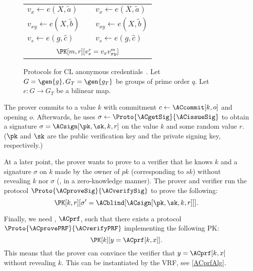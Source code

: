 \begin{figure}
\begin{tabular}{lcl}
    \(v_x\gets e(X, \tilde a)\)
    &
    & \(v_x\gets e(X, \tilde a)\)

    \\

    \(v_{xy}\gets e(X, \tilde b)\)
    &
    & \(v_{xy}\gets e(X, \tilde b)\)

    \\

    \(v_s\gets e(g, \hat c)\)
    &
    & \(v_s\gets e(g, \hat c)\)

    \\\\

    \multicolumn{3}{c}{\(\PK[m,r][v_s^r = v_x v_{xy}^m]\)}

    \\%
  \end{tabular}
  \caption{\label{ACacAlg}%
    Protocols for CL anonymous credentials~\cite{CLsignatures}.
    Let \(G = \gen{g}, G_T = \gen{g_T}\) be groups of prime order \(q\).
    Let \(e\colon G\to G_T\) be a bilinear map.
  }
\end{figure}

The prover commits to a value \(k\) with commitment \(c\gets \ACcommit[k, o]\) 
and opening \(o\).
Afterwards, he uses \(\sigma\gets \Proto{\ACgetSig}{\ACissueSig}\) to obtain a 
signature \(\sigma = \ACsign[\pk, \sk, k, r]\) on the value \(k\) and some 
random value \(r\).
(\(\pk\) and \(\sk\) are the public verification key and the private signing 
key, respectively.)

At a later point, the prover wants to prove to a verifier that he knows \(k\) and a signature \(\sigma\) on \(k\) made by the owner of \(pk\) (corresponding to \(sk\)) without revealing \(k\) nor \(\sigma\) (\ie, in a zero-knowledge manner).
The prover and verifier run the protocol \(\Proto{\ACproveSig}{\ACverifySig}\) 
to prove the following:
\begin{equation*}
  \PK[k, r][\sigma' = \ACblind[\ACsign[\pk, \sk, k, r]]].
\end{equation*}

Finally, we need , \(\ACprf\), such that there exists a protocol 
\(\Proto{\ACprovePRF}{\ACverifyPRF}\) implementing the following \ac{PK}:
\begin{equation*}
  \PK[k][y = \ACprf[k, x]].
\end{equation*}
This means that the prover can convince the verifier that \(y = \ACprf[k, x]\) 
without revealing \(k\).
This can be instantiated by the \textcite{DY-VRF} \ac{VRF}, see 
\cref{ACprfAlg}.

